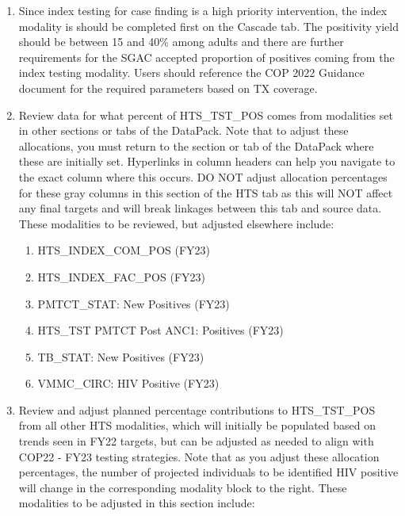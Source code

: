 \documentclass[
  openany]{book}
\begin{document}
\begin{enumerate}
\def\labelenumi{\arabic{enumi}.}
\item
  Since index testing for case finding is a high priority intervention, the index modality is should be completed first on the Cascade tab. The positivity yield should be between 15 and 40\% among adults and there are further requirements for the SGAC accepted proportion of positives coming from the index testing modality. Users should reference the COP 2022 Guidance document for the required parameters based on TX coverage.
\item
  Review data for what percent of HTS\_TST\_POS comes from modalities set in other sections or tabs of the DataPack. Note that to adjust these allocations, you must return to the section or tab of the DataPack where these are initially set. Hyperlinks in column headers can help you navigate to the exact column where this occurs. DO NOT adjust allocation percentages for these gray columns in this section of the HTS tab as this will NOT affect any final targets and will break linkages between this tab and source data. These modalities to be reviewed, but adjusted elsewhere include:

  \begin{enumerate}
  \def\labelenumii{\alph{enumii}.}
  \item
    HTS\_INDEX\_COM\_POS (FY23)
  \item
    HTS\_INDEX\_FAC\_POS (FY23)
  \item
    PMTCT\_STAT: New Positives (FY23)
  \item
    HTS\_TST PMTCT Post ANC1: Positives (FY23)
  \item
    TB\_STAT: New Positives (FY23)
  \item
    VMMC\_CIRC: HIV Positive (FY23)
  \end{enumerate}
\item
  Review and adjust planned percentage contributions to HTS\_TST\_POS from all other HTS modalities, which will initially be populated based on trends seen in FY22 targets, but can be adjusted as needed to align with COP22 - FY23 testing strategies. Note that as you adjust these allocation percentages, the number of projected individuals to be identified HIV positive will change in the corresponding modality block to the right. These modalities to be adjusted in this section include:


\end{enumerate}
\end{document}
